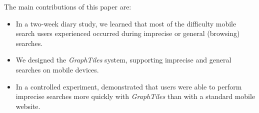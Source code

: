 The main contributions of this paper are:
\begin{itemize}
\item In a two-week diary study, we learned that most of the difficulty mobile search users experienced occurred during imprecise or general (browsing) searches.  
\item We designed the \textit{GraphTiles} system, supporting imprecise and general searches on mobile devices.
\item In a controlled experiment, demonstrated that users were able to perform imprecise searches more quickly with \textit{GraphTiles} than with a standard mobile website.
\end{itemize}


